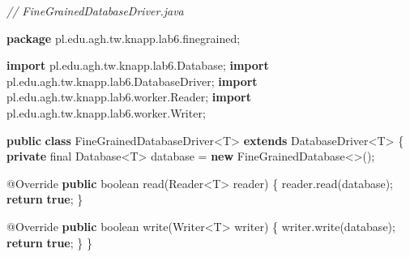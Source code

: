 \documentclass[11pt]{article}
\newenvironment{Shaded}{}{}
\newcommand{\KeywordTok}[1]{\textcolor[rgb]{0.00,0.44,0.13}{\textbf{{#1}}}}
\newcommand{\DataTypeTok}[1]{\textcolor[rgb]{0.56,0.13,0.00}{{#1}}}
\newcommand{\CommentTok}[1]{\textcolor[rgb]{0.38,0.63,0.69}{\textit{{#1}}}}
\newcommand{\FunctionTok}[1]{\textcolor[rgb]{0.02,0.16,0.49}{{#1}}}
\newcommand{\NormalTok}[1]{{#1}}
\newcommand{\ImportTok}[1]{{#1}}
\newcommand{\ControlFlowTok}[1]{\textcolor[rgb]{0.00,0.44,0.13}{\textbf{{#1}}}}
\newcommand{\OperatorTok}[1]{\textcolor[rgb]{0.40,0.40,0.40}{{#1}}}
\newcommand{\BuiltInTok}[1]{{#1}}
\newcommand{\AttributeTok}[1]{\textcolor[rgb]{0.49,0.56,0.16}{{#1}}}
\begin{document}
\begin{Shaded}
\begin{Highlighting}[]
\CommentTok{// FineGrainedDatabaseDriver.java}

\KeywordTok{package}\ImportTok{ pl}\OperatorTok{.}\ImportTok{edu}\OperatorTok{.}\ImportTok{agh}\OperatorTok{.}\ImportTok{tw}\OperatorTok{.}\ImportTok{knapp}\OperatorTok{.}\ImportTok{lab6}\OperatorTok{.}\ImportTok{finegrained}\OperatorTok{;}

\KeywordTok{import} \ImportTok{pl}\OperatorTok{.}\ImportTok{edu}\OperatorTok{.}\ImportTok{agh}\OperatorTok{.}\ImportTok{tw}\OperatorTok{.}\ImportTok{knapp}\OperatorTok{.}\ImportTok{lab6}\OperatorTok{.}\ImportTok{Database}\OperatorTok{;}
\KeywordTok{import} \ImportTok{pl}\OperatorTok{.}\ImportTok{edu}\OperatorTok{.}\ImportTok{agh}\OperatorTok{.}\ImportTok{tw}\OperatorTok{.}\ImportTok{knapp}\OperatorTok{.}\ImportTok{lab6}\OperatorTok{.}\ImportTok{DatabaseDriver}\OperatorTok{;}
\KeywordTok{import} \ImportTok{pl}\OperatorTok{.}\ImportTok{edu}\OperatorTok{.}\ImportTok{agh}\OperatorTok{.}\ImportTok{tw}\OperatorTok{.}\ImportTok{knapp}\OperatorTok{.}\ImportTok{lab6}\OperatorTok{.}\ImportTok{worker}\OperatorTok{.}\ImportTok{Reader}\OperatorTok{;}
\KeywordTok{import} \ImportTok{pl}\OperatorTok{.}\ImportTok{edu}\OperatorTok{.}\ImportTok{agh}\OperatorTok{.}\ImportTok{tw}\OperatorTok{.}\ImportTok{knapp}\OperatorTok{.}\ImportTok{lab6}\OperatorTok{.}\ImportTok{worker}\OperatorTok{.}\ImportTok{Writer}\OperatorTok{;}

\KeywordTok{public} \KeywordTok{class}\NormalTok{ FineGrainedDatabaseDriver}\OperatorTok{\textless{}}\NormalTok{T}\OperatorTok{\textgreater{}} \KeywordTok{extends}\NormalTok{ DatabaseDriver}\OperatorTok{\textless{}}\NormalTok{T}\OperatorTok{\textgreater{}} \OperatorTok{\{}
    \KeywordTok{private} \DataTypeTok{final}\NormalTok{ Database}\OperatorTok{\textless{}}\NormalTok{T}\OperatorTok{\textgreater{}}\NormalTok{ database }\OperatorTok{=} \KeywordTok{new}\NormalTok{ FineGrainedDatabase}\OperatorTok{\textless{}\textgreater{}();}

    \AttributeTok{@Override}
    \KeywordTok{public} \DataTypeTok{boolean} \FunctionTok{read}\OperatorTok{(}\BuiltInTok{Reader}\OperatorTok{\textless{}}\NormalTok{T}\OperatorTok{\textgreater{}}\NormalTok{ reader}\OperatorTok{)} \OperatorTok{\{}
\NormalTok{        reader}\OperatorTok{.}\FunctionTok{read}\OperatorTok{(}\NormalTok{database}\OperatorTok{);}
        \ControlFlowTok{return} \KeywordTok{true}\OperatorTok{;}
    \OperatorTok{\}}

    \AttributeTok{@Override}
    \KeywordTok{public} \DataTypeTok{boolean} \FunctionTok{write}\OperatorTok{(}\BuiltInTok{Writer}\OperatorTok{\textless{}}\NormalTok{T}\OperatorTok{\textgreater{}}\NormalTok{ writer}\OperatorTok{)} \OperatorTok{\{}
\NormalTok{        writer}\OperatorTok{.}\FunctionTok{write}\OperatorTok{(}\NormalTok{database}\OperatorTok{);}
        \ControlFlowTok{return} \KeywordTok{true}\OperatorTok{;}
    \OperatorTok{\}}
\OperatorTok{\}}
\end{Highlighting}
\end{Shaded}
\end{document}
